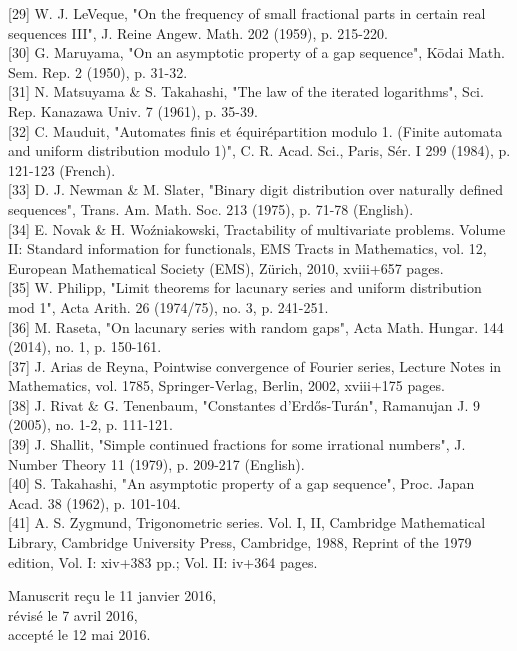 \documentclass[10pt]{article}
\begin{document}
[29] W. J. LeVeque, "On the frequency of small fractional parts in certain real sequences III", J. Reine Angew. Math. 202 (1959), p. 215-220.\\[0pt]
[30] G. Maruyama, "On an asymptotic property of a gap sequence", Kōdai Math. Sem. Rep. 2 (1950), p. 31-32.\\[0pt]
[31] N. Matsuyama \& S. Takahashi, "The law of the iterated logarithms", Sci. Rep. Kanazawa Univ. 7 (1961), p. 35-39.\\[0pt]
[32] C. Mauduit, "Automates finis et équirépartition modulo 1. (Finite automata and uniform distribution modulo 1)", C. R. Acad. Sci., Paris, Sér. I 299 (1984), p. 121-123 (French).\\[0pt]
[33] D. J. Newman \& M. Slater, "Binary digit distribution over naturally defined sequences", Trans. Am. Math. Soc. 213 (1975), p. 71-78 (English).\\[0pt]
[34] E. Novak \& H. Woźniakowski, Tractability of multivariate problems. Volume II: Standard information for functionals, EMS Tracts in Mathematics, vol. 12, European Mathematical Society (EMS), Zürich, 2010, xviii+657 pages.\\[0pt]
[35] W. Philipp, "Limit theorems for lacunary series and uniform distribution mod 1", Acta Arith. 26 (1974/75), no. 3, p. 241-251.\\[0pt]
[36] M. Raseta, "On lacunary series with random gaps", Acta Math. Hungar. 144 (2014), no. 1, p. 150-161.\\[0pt]
[37] J. Arias de Reyna, Pointwise convergence of Fourier series, Lecture Notes in Mathematics, vol. 1785, Springer-Verlag, Berlin, 2002, xviii+175 pages.\\[0pt]
[38] J. Rivat \& G. Tenenbaum, "Constantes d'Erdős-Turán", Ramanujan J. 9 (2005), no. 1-2, p. 111-121.\\[0pt]
[39] J. Shallit, "Simple continued fractions for some irrational numbers", J. Number Theory 11 (1979), p. 209-217 (English).\\[0pt]
[40] S. Takahashi, "An asymptotic property of a gap sequence", Proc. Japan Acad. 38 (1962), p. 101-104.\\[0pt]
[41] A. S. Zygmund, Trigonometric series. Vol. I, II, Cambridge Mathematical Library, Cambridge University Press, Cambridge, 1988, Reprint of the 1979 edition, Vol. I: xiv+383 pp.; Vol. II: iv+364 pages.

Manuscrit reçu le 11 janvier 2016,\\
révisé le 7 avril 2016,\\
accepté le 12 mai 2016.
\end{document}

